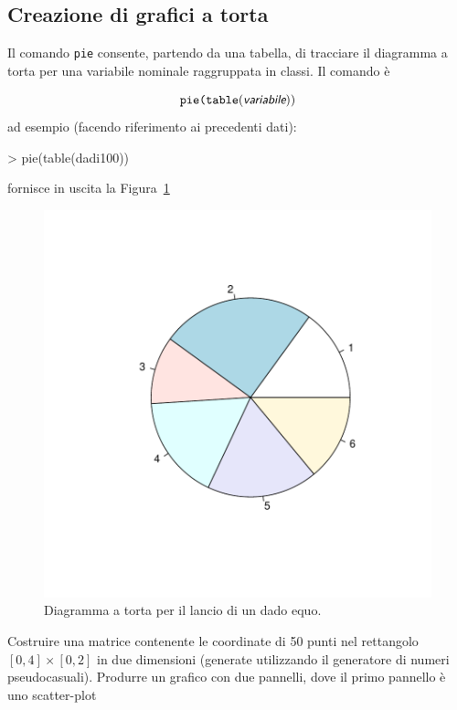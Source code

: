 \documentclass[onecolumn,12pt]{book}
\newcommand{\varia}[1]{\textsl{\textsf{#1}}}
\begin{document}
\subsection{Creazione di grafici a torta}

Il comando \texttt{pie} consente, partendo da una tabella, di tracciare il diagramma a torta per una variabile nominale raggruppata in classi. Il comando \`e

\begin{equation*}\texttt{pie(table}(\varia{variabile} ))
\end{equation*}
ad esempio (facendo riferimento ai precedenti dati):
\begin{Schunk}
\begin{Sinput}
> pie(table(dadi100))
\end{Sinput}
\end{Schunk}
fornisce in uscita  la Figura~\ref{fig:pie}
\begin{figure}[htbp]
\begin{center}
\includegraphics{RbookParte2-125}
\caption{Diagramma a torta per il lancio di un dado equo.}
\label{fig:pie}
\end{center}
\end{figure}
\begin{shaded}{Costruire una matrice contenente le coordinate di 50 punti nel rettangolo $[0,4]\times [0,2]$ in due dimensioni (generate utilizzando il generatore di numeri pseudocasuali). Produrre un grafico con due pannelli, dove il primo pannello \`e uno scatter-plot}
\end{shaded}
\end{document}
